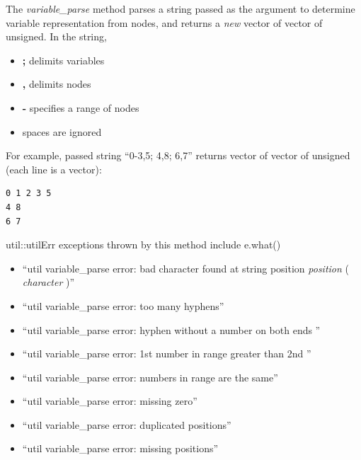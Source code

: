 \documentclass{report}
\begin{document}
The {\em variable\_parse} method parses a string passed as the
argument to determine variable representation from nodes, and returns
a {\em new} vector of vector of unsigned.  In the string,
\begin{itemize}
\item {\bf ;} delimits variables
\item {\bf ,} delimits nodes
\item {\bf -} specifies a range of nodes
\item spaces are ignored
\end{itemize}

For example, passed string ``0-3,5; 4,8; 6,7'' returns vector of
vector of unsigned (each line is a vector):
\begin{verbatim}
0 1 2 3 5
4 8
6 7
\end{verbatim}

util::utilErr exceptions thrown by this method include e.what()
\begin{itemize}
\item ``util variable\_parse error: bad character found at string
      position {\em position} ( {\em character} )''
\item ``util variable\_parse error: too many hyphens''
\item ``util variable\_parse error: hyphen without a number on both
      ends ''
\item ``util variable\_parse error: 1st number in range greater than
      2nd ''
\item ``util variable\_parse error: numbers in range are the same''
\item ``util variable\_parse error: missing zero''
\item ``util variable\_parse error: duplicated positions''
\item ``util variable\_parse error: missing positions''
\end{itemize}
\end{document}
